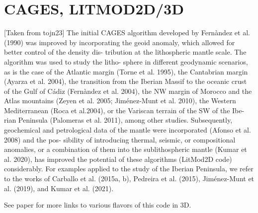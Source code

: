 \section{CAGES, LITMOD2D/3D}

[Taken from tojn23]
The initial CAGES algorithm developed by Fernàndez et al. (1990) was improved by
incorporating the geoid anomaly, which allowed for better control of the density dis-
tribution at the lithospheric mantle scale. The algorithm was used to study the litho-
sphere in different geodynamic scenarios, as is the case of the Atlantic margin (Torne
et al. 1995), the Cantabrian margin (Ayarza et al. 2004), the transition from the Iberian
Massif to the oceanic crust of the Gulf of Cádiz (Fernàndez et al. 2004), the NW margin
of Morocco and the Atlas mountains (Zeyen et al. 2005; Jiménez-Munt et al. 2010), the
Western Mediterranean (Roca et al.2004), or the Variscan terrain of the SW of the Ibe-
rian Peninsula (Palomeras et al. 2011), among other studies. Subsequently, geochemical
and petrological data of the mantle were incorporated (Afonso et al. 2008) and the pos-
sibility of introducing thermal, seismic, or compositional anomalies, or a combination
of them into the sublithospheric mantle (Kumar et al. 2020), has improved the potential
of these algorithms (LitMod2D code) considerably. For examples applied to the study of
the Iberian Peninsula, we refer to the works of Carballo et al. (2015a, b), Pedreira et al.
(2015), Jiménez-Munt et al. (2019), and Kumar et al. (2021).

See paper for more links to various flavors of this code in 3D.



